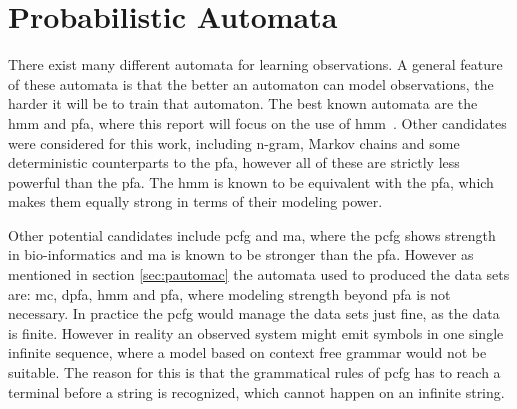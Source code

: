 \section{Probabilistic Automata}
There exist many different automata for learning observations. A general feature of these automata is that the better an automaton can model observations, the harder it will be to train that automaton. The best known automata are the \gls{hmm} and \gls{pfa}, where this report will focus on the use of \gls{hmm}~\cite{pautomacTR}.
Other candidates were considered for this work, including n-gram, Markov chains and some deterministic counterparts to the \gls{pfa}, however all of these are strictly less powerful than the \gls{pfa}. The \gls{hmm} is known to be equivalent with the \gls{pfa}, which makes them equally strong in terms of their modeling power.

Other potential candidates include \gls{pcfg} and \gls{ma}, where the \gls{pcfg} shows strength in bio-informatics and \gls{ma} is known to be stronger than the \gls{pfa}. However as mentioned in section \ref{sec:pautomac} the automata used to produced the data sets are: \gls{mc}, \gls{dpfa}, \gls{hmm} and \gls{pfa}, where modeling strength beyond \gls{pfa} is not necessary. In practice the \gls{pcfg} would manage the data sets just fine, as the data is finite. However in reality an observed system might emit symbols in one single infinite sequence, where a model based on context free grammar would not be suitable. The reason for this is that the grammatical rules of \gls{pcfg} has to reach a terminal before a string is recognized, which cannot happen on an infinite string.
